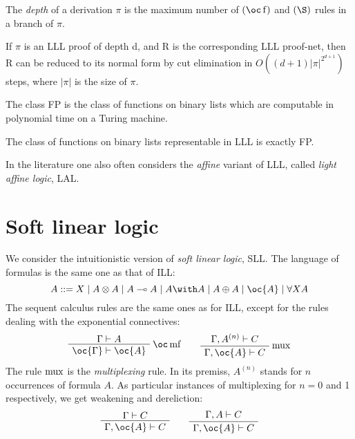 The \emph{depth} of a derivation \(\pi\) is the maximum number of
\((\oc\rulename{f})\) and \((\pg)\) rules in a branch of \(\pi\).

\begin{theorem}
If $\pi$ is an LLL proof of depth d, and R is the corresponding LLL proof-net, then R can be reduced to its normal form by cut elimination in  $ O((d+1)|\pi|^{2^{d+1}})$ steps, where $|\pi|$ is the size of $\pi$.
\end{theorem}

The class FP is the class of functions on binary lists which are
computable in polynomial time on a Turing machine.

\begin{theorem}
The class of functions on binary lists representable in LLL is exactly FP.
\end{theorem}

In the literature one also often considers the \emph{affine} variant of
LLL, called \emph{light affine logic}, LAL.

\section{Soft linear logic}\label{soft-linear-logic}

We consider the intuitionistic version of \emph{soft linear logic}, SLL.
The language of formulas is the same one as that of ILL:
\begin{equation*}
A ::= X \mid A\tens A \mid A\limp A \mid A\with A \mid  A\plus A   \mid \oc{A} \mid \forall X A
\end{equation*}
The sequent calculus rules are the same ones as for ILL, except for the
rules dealing with the exponential connectives:
\begin{equation*}
\AxRule{\Gamma\vdash A}
\LabelRule{\oc\rulename{mf}}
\UnaRule{\oc{\Gamma}\vdash\oc{A}}
\DisplayProof
\qquad
\AxRule{\Gamma,A^{(n)}\vdash C}
\LabelRule{\rulename{mux}}
\UnaRule{\Gamma,\oc{A}\vdash C}
\DisplayProof
\end{equation*}
The rule $\operatorname{mux}$ is the \emph{multiplexing} rule. In its premiss,
\(A^{(n)}\) stands for $n$ occurrences of formula \(A\). As particular
instances of multiplexing for \(n=0\) and 1 respectively, we get weakening and
dereliction:
\begin{equation*}
\AxRule{\Gamma \vdash C}
\UnaRule{\Gamma,\oc{A}\vdash C}
\DisplayProof
\qquad
\AxRule{\Gamma,A\vdash C}
\UnaRule{\Gamma,\oc{A}\vdash C}
\DisplayProof
\end{equation*}

